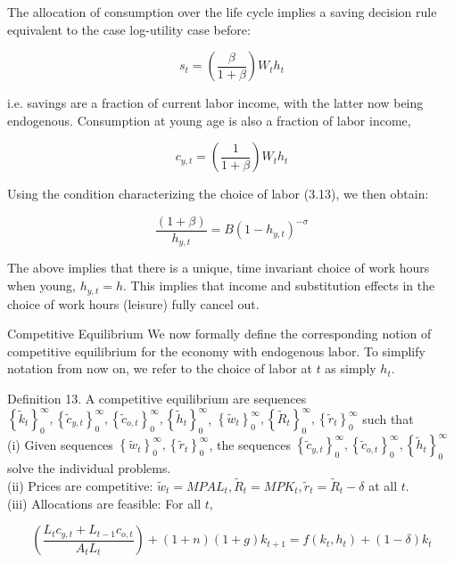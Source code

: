 \documentclass[10pt]{article}
\begin{document}
The allocation of consumption over the life cycle implies a saving decision rule equivalent to the case log-utility case before:

$$
s_{t}=\left(\frac{\beta}{1+\beta}\right) W_{t} h_{t}
$$

i.e. savings are a fraction of current labor income, with the latter now being endogenous. Consumption at young age is also a fraction of labor income,

$$
c_{y, t}=\left(\frac{1}{1+\beta}\right) W_{t} h_{t}
$$

Using the condition characterizing the choice of labor (3.13), we then obtain:


\begin{equation*}
\frac{(1+\beta)}{h_{y, t}}=B\left(1-h_{y, t}\right)^{-\sigma} \tag{3.14}
\end{equation*}


The above implies that there is a unique, time invariant choice of work hours when young, $h_{y, t}=h$. This implies that income and substitution effects in the choice of work hours (leisure) fully cancel out.

Competitive Equilibrium We now formally define the corresponding notion of competitive equilibrium for the economy with endogenous labor. To simplify notation from now on, we refer to the choice of labor at $t$ as simply $h_{t}$.

Definition 13. A competitive equilibrium are sequences $\left\{\tilde{k}_{t}\right\}_{0}^{\infty},\left\{\tilde{c}_{y, t}\right\}_{0}^{\infty},\left\{\tilde{c}_{o, t}\right\}_{0}^{\infty},\left\{\tilde{h}_{t}\right\}_{0}^{\infty}$, $\left\{\tilde{w}_{t}\right\}_{0}^{\infty},\left\{\tilde{R}_{t}\right\}_{0}^{\infty},\left\{\tilde{r}_{t}\right\}_{0}^{\infty}$ such that\\
(i) Given sequences $\left\{\tilde{w}_{t}\right\}_{0}^{\infty},\left\{\tilde{r}_{t}\right\}_{0}^{\infty}$, the sequences $\left\{\tilde{c}_{y, t}\right\}_{0}^{\infty},\left\{\tilde{c}_{o, t}\right\}_{0}^{\infty},\left\{\tilde{h}_{t}\right\}_{0}^{\infty}$ solve the individual problems.\\
(ii) Prices are competitive: $\tilde{w}_{t}=M P A L_{t}, \tilde{R}_{t}=M P K_{t}, \tilde{r}_{t}=\tilde{R}_{t}-\delta$ at all $t$.\\
(iii) Allocations are feasible: For all $t$,


\begin{equation*}
\left(\frac{L_{t} c_{y, t}+L_{t-1} c_{o, t}}{A_{t} L_{t}}\right)+(1+n)(1+g) k_{t+1}=f\left(k_{t}, h_{t}\right)+(1-\delta) k_{t} \tag{3.15}
\end{equation*}
\end{document}

